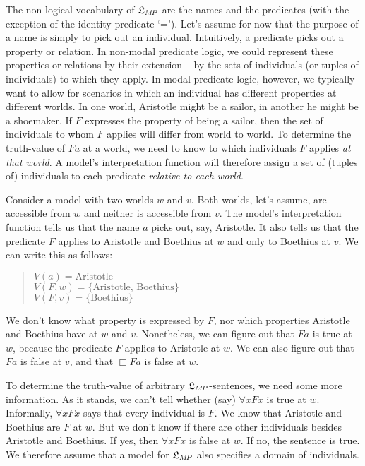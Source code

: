 The non-logical vocabulary of $\mathfrak{L}_{M\!P}$ are the names and the predicates (with
the exception of the identity predicate `='). Let's assume for now that the
purpose of a name is simply to pick out an individual. Intuitively, a predicate
picks out a property or relation. In non-modal predicate logic, we could
represent these properties or relations by their extension -- by the sets of
individuals (or tuples of individuals) to which they apply. In modal predicate
logic, however, we typically want to allow for scenarios in which an individual
has different properties at different worlds. In one world, Aristotle might be a
sailor, in another he might be a shoemaker. If $F$ expresses the property of
being a sailor, then the set of individuals to whom $F$ applies will differ from
world to world. To determine the truth-value of $Fa$ at a world, we need to know
to which individuals $F$ applies \emph{at that world}. A model's interpretation
function will therefore assign a set of (tuples of) individuals to each
predicate \emph{relative to each world}.

Consider a model with two worlds $w$ and $v$. Both worlds, let's assume, are
accessible from $w$ and neither is accessible from $v$. The model's
interpretation function tells us that the name $a$ picks out, say, Aristotle. It
also tells us that the predicate $F$ applies to Aristotle and Boethius at $w$
and only to Boethius at $v$. We can write this as follows:
%
\begin{quote}
  $V(a) = \text{Aristotle}$\\
  $V(F,w) = \{ \text{Aristotle, Boethius} \}$\\
  $V(F,v) = \{ \text{Boethius} \}$
\end{quote}
%
\noindent%
We don't know what property is expressed by $F$, nor which properties Aristotle
and Boethius have at $w$ and $v$. Nonetheless, we can figure out that $Fa$ is
true at $w$, because the predicate $F$ applies to Aristotle at $w$. We can also
figure out that $Fa$ is false at $v$, and that $\Box Fa$ is false at $w$.

To determine the truth-value of arbitrary $\mathfrak{L}_{M\!P}$-sentences, we need some
more information. As it stands, we can't tell whether (say) $\forall x Fx$ is
true at $w$. Informally, $\forall x Fx$ says that every individual is $F$. We
know that Aristotle and Boethius are $F$ at $w$. But we don't know if there are
other individuals besides Aristotle and Boethius. If yes, then $\forall x Fx$ is
false at $w$. If no, the sentence is true. We therefore assume that a model for
$\mathfrak{L}_{M\!P}$ also specifies a domain of individuals.

